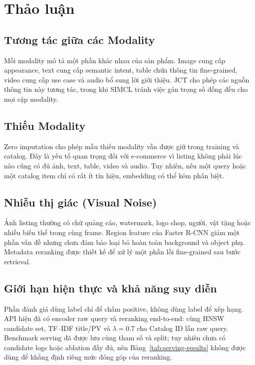\documentclass[10pt,conference]{IEEEtran}
\begin{document}
\FloatBarrier

\section{Thảo luận}

\subsection{Tương tác giữa các Modality}

Mỗi modality mô tả một phần khác nhau của sản phẩm. Image cung cấp appearance, text cung cấp semantic intent, table chứa thông tin fine-grained, video cung cấp use case và audio bổ sung lời giới thiệu. JCT cho phép các nguồn thông tin này tương tác, trong khi SIMCL tránh việc gán trọng số đồng đều cho mọi cặp modality.

\subsection{Thiếu Modality}

Zero imputation cho phép mẫu thiếu modality vẫn được giữ trong training và catalog. Đây là yếu tố quan trọng đối với e-commerce vì listing không phải lúc nào cũng có đủ ảnh, text, table, video và audio. Tuy nhiên, nếu một query hoặc một catalog item chỉ có rất ít tín hiệu, embedding có thể kém phân biệt.

\subsection{Nhiễu thị giác (Visual Noise)}

Ảnh listing thường có chữ quảng cáo, watermark, logo shop, người, vật tặng hoặc nhiều biến thể trong cùng frame. Region feature của Faster R-CNN giảm một phần vấn đề nhưng chưa đảm bảo loại bỏ hoàn toàn background và object phụ. Metadata reranking được thiết kế để xử lý một phần lỗi fine-grained sau bước retrieval.

\subsection{Giới hạn hiện thực và khả năng suy diễn}

Phần đánh giá dùng label chỉ để chấm positive, không dùng label để xếp hạng. API hiện đã có encoder raw query và reranking end-to-end: cùng HNSW candidate set, TF--IDF title/PV và $\lambda=0.7$ cho Catalog ID lẫn raw query. Benchmark serving đã được lưu cùng tham số và split; tuy nhiên chưa có candidate logs hoặc ablation đầy đủ, nên Bảng~\ref{tab:serving-results} không được dùng để khẳng định riêng mức đóng góp của reranking.
\end{document}
